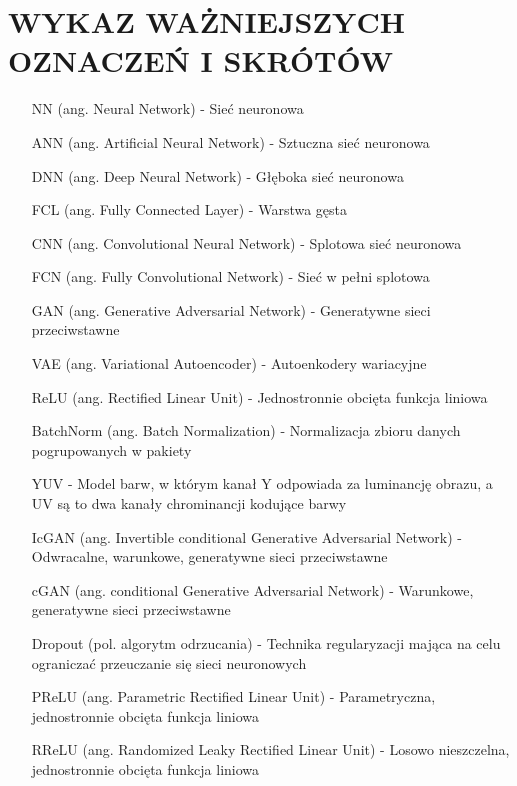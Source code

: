 \section*{WYKAZ WAŻNIEJSZYCH OZNACZEŃ I SKRÓTÓW}

  \bigskip

  \begin{itemize}
    \item[NN] (ang. Neural Network) - Sieć neuronowa
    \item[ANN] (ang. Artificial Neural Network) - Sztuczna sieć neuronowa
    \item[DNN] (ang. Deep Neural Network) - Głęboka sieć neuronowa
    \item[FCL] (ang. Fully Connected Layer) - Warstwa gęsta
    \item[CNN] (ang. Convolutional Neural Network) - Splotowa sieć neuronowa
    \item[FCN] (ang. Fully Convolutional Network) - Sieć w pełni splotowa
    \item[GAN] (ang. Generative Adversarial Network) - Generatywne sieci
    przeciwstawne
    \item[VAE] (ang. Variational Autoencoder) - Autoenkodery wariacyjne
    \item[ReLU] (ang. Rectified Linear Unit) - Jednostronnie obcięta funkcja liniowa
    \item[BatchNorm] (ang. Batch Normalization) - Normalizacja zbioru danych
    pogrupowanych w pakiety
    \item[YUV] - Model barw, w którym kanał Y odpowiada za luminancję obrazu, a UV
    są to dwa kanały chrominancji kodujące barwy
    \item[IcGAN] (ang. Invertible conditional Generative Adversarial Network) -
    Odwracalne, warunkowe, generatywne sieci przeciwstawne
    \item[cGAN] (ang. conditional Generative Adversarial Network) - Warunkowe,
    generatywne sieci przeciwstawne
    \item[Dropout] (pol. algorytm odrzucania) - Technika
    regularyzacji mająca na celu ograniczać przeuczanie się sieci neuronowych
    \item[PReLU] (ang. Parametric Rectified Linear Unit) - Parametryczna,
    jednostronnie obcięta funkcja liniowa
    \item[RReLU] (ang. Randomized Leaky Rectified Linear Unit) - Losowo nieszczelna,
    jednostronnie obcięta funkcja liniowa

\end{itemize}
